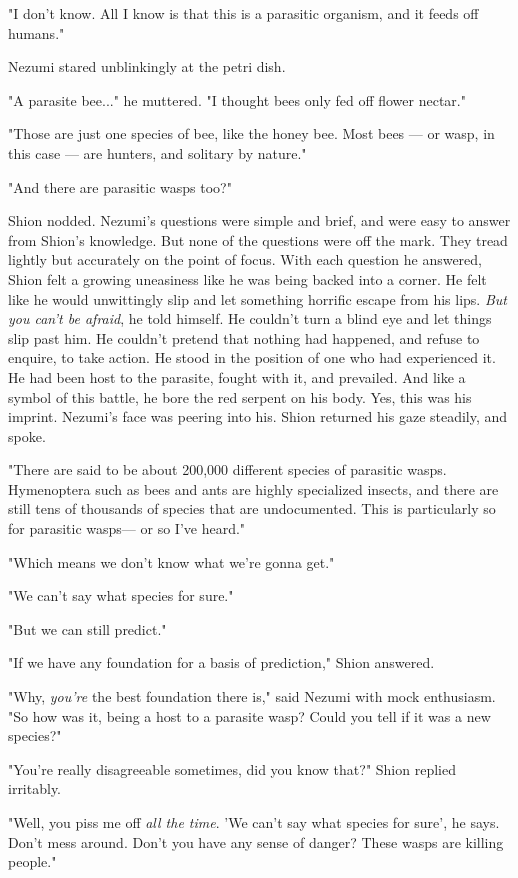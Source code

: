"I don't know. All I know is that this is a parasitic organism, and it
feeds off humans."

Nezumi stared unblinkingly at the petri dish.

"A parasite bee..." he muttered. "I thought bees only fed off flower
nectar."

"Those are just one species of bee, like the honey bee. Most bees --- or
wasp, in this case --- are hunters, and solitary by nature."

"And there are parasitic wasps too?"

Shion nodded. Nezumi's questions were simple and brief, and were easy to
answer from Shion's knowledge. But none of the questions were off the
mark. They tread lightly but accurately on the point of focus. With each
question he answered, Shion felt a growing uneasiness like he was being
backed into a corner. He felt like he would unwittingly slip and let
something horrific escape from his lips. \emph{But you can't be afraid}, he
told himself. He couldn't turn a blind eye and let things slip past him.
He couldn't pretend that nothing had happened, and refuse to enquire, to
take action. He stood in the position of one who had experienced it. He
had been host to the parasite, fought with it, and prevailed. And like a
symbol of this battle, he bore the red serpent on his body. Yes, this
was his imprint. Nezumi's face was peering into his. Shion returned his
gaze steadily, and spoke.

"There are said to be about 200,000 different species of parasitic
wasps. Hymenoptera such as bees and ants are highly specialized insects,
and there are still tens of thousands of species that are undocumented.
This is particularly so for parasitic wasps--- or so I've heard."

"Which means we don't know what we're gonna get."

"We can't say what species for sure."

"But we can still predict."

"If we have any foundation for a basis of prediction," Shion answered.

"Why, \emph{you're} the best foundation there is," said Nezumi with mock
enthusiasm. "So how was it, being a host to a parasite wasp? Could you
tell if it was a new species?"

"You're really disagreeable sometimes, did you know that?" Shion replied
irritably.

"Well, you piss me off \emph{all the time}. 'We can't say what species for
sure', he says. Don't mess around. Don't you have any sense of danger?
These wasps are killing people."

